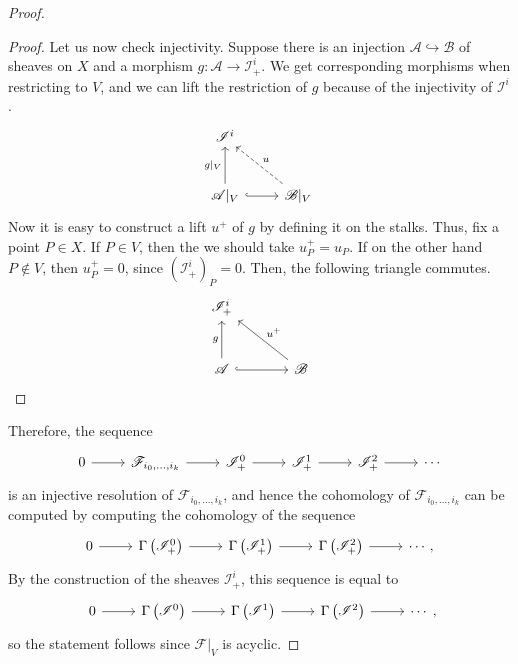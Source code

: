 \begin{proof}
{\begin{proof}
      Let us now check injectivity. Suppose there is an injection
      $\mathscr{A}\hookrightarrow\mathscr{B}$ of sheaves on $X$ and a
      morphism $g:\mathscr{A}\to\mathscr{I}_{+}^{i}$. We get corresponding
      morphisms when restricting to $V$, and we can lift the restriction of
      $g$ because of the injectivity of $\mathscr{I}^{i}$.
      \[\begin{tikzcd}[row sep=large]
          \mathscr{I}^{i} & \\ \mathscr{A}\vert_{V}\uar{g\vert_{V}}\rar[hook]
          & \mathscr{B}\vert_{V}\arrow[ul, dashed, "u"']
        \end{tikzcd}\]
      Now it is easy to construct a lift $u^{+}$ of $g$ by defining it on the
      stalks. Thus, fix a point $P\in X$. If $P\in V$, then the we should
      take $u^{+}_{P}=u_{P}$. If on the other hand $P\not\in V$, then
      $u^{+}_{P}=0$, since $\left(\mathscr{I}_{+}^{i}\right)_{P}=0$. Then,
      the following triangle commutes.
      \[\begin{tikzcd}[row sep=large, column sep=large]
          \mathscr{I}_{+}^{i} & \\ \mathscr{A}\uar{g}\rar[hook]
          & \mathscr{B}\arrow[ul, "u^{+}"']
        \end{tikzcd}\]
    \end{proof}
  }
  Therefore, the sequence
  \[\begin{tikzcd}
      0\rar & \mathscr{F}_{i_{0},\ldots,i_{k}}\rar & \mathscr{I}_{+}^{0}\rar
      & \mathscr{I}_{+}^{1}\rar & \mathscr{I}_{+}^{2}\rar & \cdots
    \end{tikzcd}\]
  is an injective resolution of $\mathscr{F}_{i_{0},\ldots,i_{k}}$,
  and hence the cohomology of $\mathscr{F}_{i_{0},\ldots,i_{k}}$ can
  be computed by computing the cohomology of the sequence
  \[\begin{tikzcd}
    0\rar & \Gamma\left(\mathscr{I}_{+}^{0}\right)\rar
    & \Gamma\left(\mathscr{I}_{+}^{1}\right)\rar
    & \Gamma\left(\mathscr{I}_{+}^{2}\right)\rar & \cdots,
    \end{tikzcd}\]
  By the construction of the sheaves $\mathscr{I}_{+}^{i}$, this sequence is
  equal to
  \[\begin{tikzcd}
      0\rar & \Gamma\left(\mathscr{I}^{0}\right)\rar
      & \Gamma\left(\mathscr{I}^{1}\right)\rar
      & \Gamma\left(\mathscr{I}^{2}\right)\rar & \cdots
    \end{tikzcd},\]
  so the statement follows since $\mathscr{F}\vert_{V}$ is acyclic.
\end{proof}


